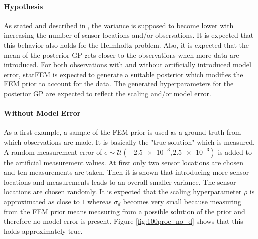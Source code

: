 \documentclass[%
  a4paper,oneside,%
  11pt,%
  smallchapters,
  style=printdev,
  extramargin,
  green,%
  rgb, <cmyk>
  ]{tubsbook}
\begin{document}
\paragraph{Hypothesis}
As stated and described in \cite{rasmussen2006}, the variance is supposed to become lower with increasing the number of sensor locations and/or observations. It is expected that this behavior also holds for the Helmholtz problem. Also, it is expected that the mean of the posterior GP gets closer to the observations when more data are introduced. For both observations with and without artificially introduced model error, statFEM is expected to generate a suitable posterior which modifies the FEM prior to account for the data. The generated hyperparameters for the posterior GP are expected to reflect the scaling and/or model error.


\paragraph{Without Model Error}
As a first example, a sample of the FEM prior is used as a ground truth from which observations are made. It is basically the "true solution" which is measured. A random measurement error of $e \sim \mathcal{U}(\num{-2.5e-3}, \num{2.5e-3})$ is added to the artificial measurement values. At first only two sensor locations are chosen and ten measurements are taken. Then it is shown that introducing more sensor locations and measurements leads to an overall smaller variance. The sensor locations are chosen randomly. It is expected that the scaling hyperparameter $\rho$ is approximated as close to $1$ whereas $\sigma_d$ becomes very small because measuring from the FEM prior means measuring from a possible solution of the prior and therefore no model error is present. Figure \ref{fig:100proc_no_d} shows that this holds approximately true. %
\end{document}
